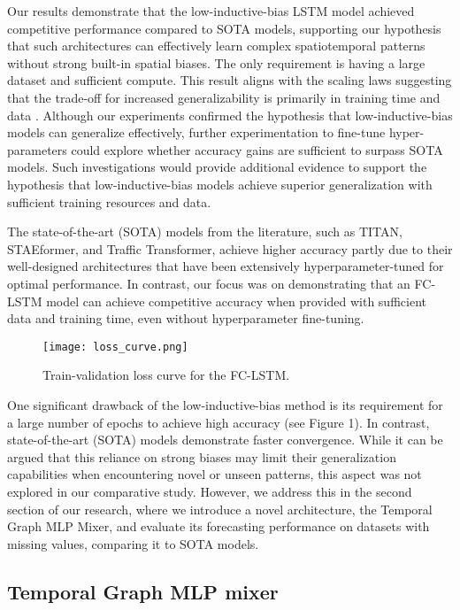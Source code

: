 \documentclass{article}
\theoremstyle{plain}
\theoremstyle{definition}
\theoremstyle{remark}
\begin{document}
Our results demonstrate that the low-inductive-bias LSTM model achieved competitive performance compared to SOTA models, supporting our hypothesis that such architectures can effectively learn complex spatiotemporal patterns without strong built-in spatial biases. The only requirement is having a large dataset and sufficient compute. This result aligns with the scaling laws suggesting that the trade-off for increased generalizability is primarily in training time and data \cite{bachmann2024scaling}. Although our experiments confirmed the hypothesis that low-inductive-bias models can generalize effectively, further experimentation to fine-tune hyper-parameters could explore whether accuracy gains are sufficient to surpass SOTA models. Such investigations would provide additional evidence to support the hypothesis that low-inductive-bias models achieve superior generalization with sufficient training resources and data.

The state-of-the-art (SOTA) models from the literature, such as TITAN, STAEformer, and Traffic Transformer, achieve higher accuracy partly due to their well-designed architectures that have been extensively hyperparameter-tuned for optimal performance. In contrast, our focus was on demonstrating that an FC-LSTM model can achieve competitive accuracy when provided with sufficient data and training time, even without hyperparameter fine-tuning.

\begin{figure}[h!]
    \centering
    \texttt{[image: loss\_curve.png]}
    \caption{Train-validation loss curve for the FC-LSTM.}
    \label{fig:loss_curve}
\end{figure}


One significant drawback of the low-inductive-bias method is its requirement for a large number of epochs to achieve high accuracy (see Figure 1). In contrast, state-of-the-art (SOTA) models demonstrate faster convergence. While it can be argued that this reliance on strong biases may limit their generalization capabilities when encountering novel or unseen patterns, this aspect was not explored in our comparative study. However, we address this in the second section of our research, where we introduce a novel architecture, the Temporal Graph MLP Mixer, and evaluate its forecasting performance on datasets with missing values, comparing it to SOTA models.

\subsection{Temporal Graph MLP mixer}
\end{document}
